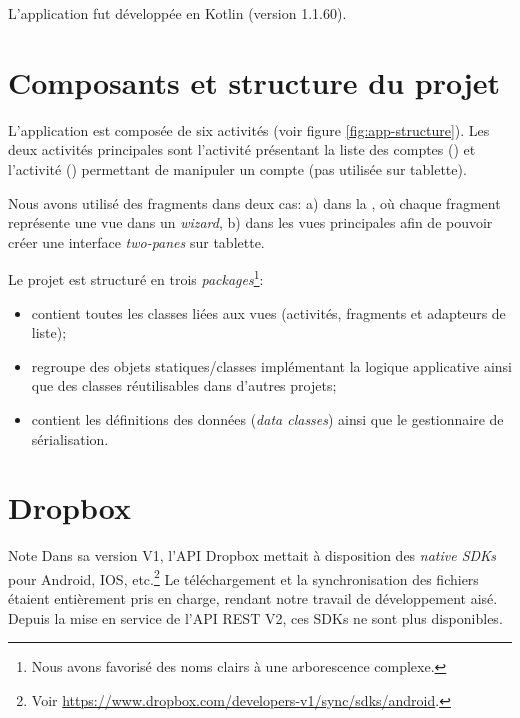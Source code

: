 
L'application \easypass{} fut développée en Kotlin (version 1.1.60).


\section{Composants et structure du projet}

L'application est composée de six activités (voir figure \ref{fig:app-structure}). Les deux activités principales sont l'activité présentant la liste des comptes () et l'activité () permettant de manipuler un compte (pas utilisée sur tablette). 

Nous avons utilisé des fragments dans deux cas: a) dans la , où chaque fragment représente une vue dans un \emph{wizard}, b) dans les vues principales afin de pouvoir créer une interface \emph{two-panes} sur tablette.


Le projet est structuré en trois \emph{packages}\footnote{Nous avons favorisé des noms clairs à une arborescence complexe.}:

\begin{itemize}
\item {} contient toutes les classes liées aux vues (activités, fragments et adapteurs de liste);
\item {} regroupe des objets statiques/classes implémentant la logique applicative ainsi que des classes réutilisables dans d'autres projets;
\item {} contient les définitions des données (\emph{data classes}) ainsi que le gestionnaire de sérialisation.
\end{itemize}

\section{Dropbox}

\begin{notepar}{Note}
Dans sa version V1, l'API Dropbox mettait à disposition des \emph{native SDKs} pour Android, IOS, etc.\footnote{Voir \url{https://www.dropbox.com/developers-v1/sync/sdks/android}.} Le téléchargement et la synchronisation des fichiers étaient entièrement pris en charge, rendant notre travail de développement aisé. Depuis la mise en service de l'API REST V2, ces SDKs ne sont plus disponibles.
\end{notepar}

